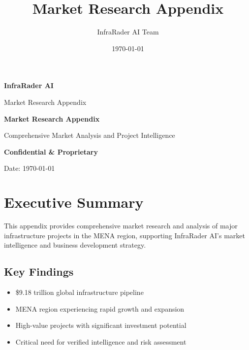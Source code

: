 \documentclass[business]{../templates/infraradar-main}
\title{Market Research Appendix}
\author{InfraRader AI Team}
\date{\today}
\begin{document}
\begin{titlepage}
    \centering
    \vspace*{2cm}
    
    {\Huge\bfseries\color{infraradar@primary} InfraRader AI\par}
    \vspace{0.5cm}
    {\Large\color{infraradar@text} Market Research Appendix\par}
    \vspace{2cm}
    
    {\huge\bfseries Market Research Appendix\par}
    \vspace{1cm}
    
    {\large Comprehensive Market Analysis and Project Intelligence\par}
    \vspace{2cm}
    
    {\large\bfseries\color{infraradar@primary} Confidential \& Proprietary\par}
    {\large Date: \today\par}
    
\end{titlepage}

\tableofcontents
\newpage

\section{Executive Summary}

This appendix provides comprehensive market research and analysis of major infrastructure projects in the MENA region, supporting InfraRader AI's market intelligence and business development strategy.

\subsection{Key Findings}
\begin{itemize}
    \item \$9.18 trillion global infrastructure pipeline
    \item MENA region experiencing rapid growth and expansion
    \item High-value projects with significant investment potential
    \item Critical need for verified intelligence and risk assessment
\end{itemize}
\end{document}

